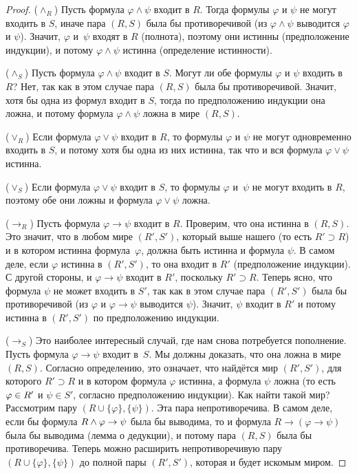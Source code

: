 \begin{proof}
($\land_R$) Пусть формула ${\varphi\land\psi}$ входит в $R$.
Тогда формулы $\varphi$ и $\psi$ не могут входить в $S$, иначе
пара $(R,S)$ была бы противоречивой (из ${\varphi\land\psi}$
выводится $\varphi$ и $\psi$). Значит, $\varphi$ и~$\psi$ входят
в $R$ (полнота), поэтому они истинны (предположение индукции),
и потому ${\varphi\land\psi}$ истинна (определение истинности).

($\land_S$) Пусть формула ${\varphi\land\psi}$ входит в $S$.
Могут ли обе формулы $\varphi$ и $\psi$ входить в $R$? Нет, так
как в этом случае пара $(R,S)$ была бы противоречивой. Значит,
хотя бы одна из формул входит в $S$, тогда по предположению
индукции она ложна, и потому формула ${\varphi\land\psi}$ ложна в
мире $(R,S)$.

($\lor_R$) Если формула ${\varphi\lor\psi}$ входит в $R$, то
формулы $\varphi$ и $\psi$ не могут одновременно входить в $S$,
и потому хотя бы одна из них истинна, так что и вся формула
${\varphi\lor\psi}$ истинна.

($\lor_S$) Если формула ${\varphi\lor\psi}$ входит в $S$, то
формулы $\varphi$ и~$\psi$ не могут входить в $R$, поэтому обе они
ложны и формула ${\varphi\lor\psi}$ ложна.

($\to_R$) Пусть формула ${\varphi\to\psi}$ входит в $R$.
Проверим, что она истинна в $(R,S)$. Это значит, что в любом
мире $(R',S')$, который выше нашего (то есть $R'\supset R$) и в
котором истинна формула~$\varphi$, должна быть истинна и формула
$\psi$. В самом деле, если $\varphi$ истинна в $(R',S')$, то она
входит в $R'$ (предположение индукции). С другой стороны, и
${\varphi\to\psi}$ входит в $R'$, поскольку $R'\supset R$.
Теперь ясно, что формула $\psi$ не может входить в $S'$, так как
в этом случае пара $(R',S')$ была бы противоречивой (из
$\varphi$ и $\varphi\to\psi$ выводится $\psi$). Значит, $\psi$
входит в $R'$ и потому истинна в $(R',S')$ по предположению
индукции.

($\to_S$) Это наиболее интересный случай, где нам снова
потребуется пополнение. Пусть формула ${\varphi\to\psi}$ входит
в~$S$. Мы должны доказать, что она ложна в мире $(R,S)$.
Согласно определению, это означает, что найдётся мир $(R',S')$,
для которого $R'\supset R$ и в котором формула $\varphi$
истинна, а формула $\psi$ ложна (то есть $\varphi\hm\in R'$ и
$\psi\in S'$, согласно предположению индукции). Как найти такой
мир? Рассмотрим пару $({R\cup\{\varphi\}},\{\psi\})$. Эта пара
непротиворечива. В самом деле, если бы формула
${R\land\varphi}\hm\to\psi$ была бы выводима, то и формула
$R\to(\varphi\to\psi)$ была бы выводима (лемма о дедукции), и
потому пара $(R,S)$ была бы противоречива. Теперь можно
расширить непротиворечивую пару $({R\cup\{\varphi\}},\{\psi\})$
до полной пары $(R',S')$, которая и будет искомым миром.


\end{proof}
